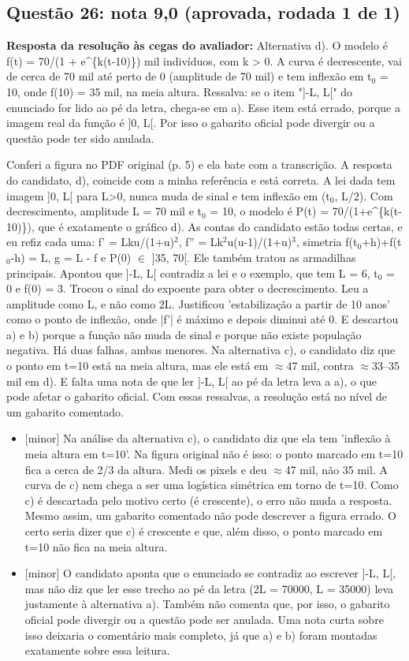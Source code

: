 \documentclass{article}%
\begin{document}
\subsection*{Questão 26: nota 9,0 (aprovada, rodada 1 de 1)}%
\textbf{Resposta da resolução às cegas do avaliador:} Alternativa d). O modelo é f(t) = 70/(1 + e\^{}\{k(t-10)\}) mil indivíduos, com k > 0. A curva é decrescente, vai de cerca de 70 mil até perto de 0 (amplitude de 70 mil) e tem inflexão em t$_{0}$ = 10, onde f(10) = 35 mil, na meia altura. Ressalva: se o item "{]}-L, L{[}" do enunciado for lido ao pé da letra, chega{-}se em a). Esse item está errado, porque a imagem real da função é {]}0, L{[}. Por isso o gabarito oficial pode divergir ou a questão pode ter sido anulada.\par %
Conferi a figura no PDF original (p. 5) e ela bate com a transcrição. A resposta do candidato, d), coincide com a minha referência e está correta. A lei dada tem imagem {]}0, L{[} para L>0, nunca muda de sinal e tem inflexão em (t$_{0}$, L/2). Com decrescimento, amplitude L = 70 mil e t$_{0}$ = 10, o modelo é P(t) = 70/(1+e\^{}\{k(t-10)\}), que é exatamente o gráfico d). As contas do candidato estão todas certas, e eu refiz cada uma: f' = Lku/(1+u)$^2$, f'' = Lk$^2$u(u-1)/(1+u)$^3$, simetria f(t$_{0}$+h)+f(t$_{0}$-h) = L, g = L - f e P(0) $\in$ {]}35, 70{[}. Ele também tratou as armadilhas principais. Apontou que {]}-L, L{[} contradiz a lei e o exemplo, que tem L = 6, t$_{0}$ = 0 e f(0) = 3. Trocou o sinal do expoente para obter o decrescimento. Leu a amplitude como L, e não como 2L. Justificou 'estabilização a partir de 10 anos' como o ponto de inflexão, onde |f'| é máximo e depois diminui até 0. E descartou a) e b) porque a função não muda de sinal e porque não existe população negativa. Há duas falhas, ambas menores. Na alternativa c), o candidato diz que o ponto em t=10 está na meia altura, mas ele está em $\approx$47 mil, contra $\approx$33--35 mil em d). E falta uma nota de que ler {]}-L, L{[} ao pé da letra leva a a), o que pode afetar o gabarito oficial. Com essas ressalvas, a resolução está no nível de um gabarito comentado.%
\begin{itemize}%
\item%
{[}minor{]} Na análise da alternativa c), o candidato diz que ela tem 'inflexão à meia altura em t=10'. Na figura original não é isso: o ponto marcado em t=10 fica a cerca de 2/3 da altura. Medi os pixels e deu $\approx$47 mil, não 35 mil. A curva de c) nem chega a ser uma logística simétrica em torno de t=10. Como c) é descartada pelo motivo certo (é crescente), o erro não muda a resposta. Mesmo assim, um gabarito comentado não pode descrever a figura errado. O certo seria dizer que c) é crescente e que, além disso, o ponto marcado em t=10 não fica na meia altura.%
\item%
{[}minor{]} O candidato aponta que o enunciado se contradiz ao escrever {]}-L, L{[}, mas não diz que ler esse trecho ao pé da letra (2L = 70000, L = 35000) leva justamente à alternativa a). Também não comenta que, por isso, o gabarito oficial pode divergir ou a questão pode ser anulada. Uma nota curta sobre isso deixaria o comentário mais completo, já que a) e b) foram montadas exatamente sobre essa leitura.%
\end{itemize}%
\end{document}
